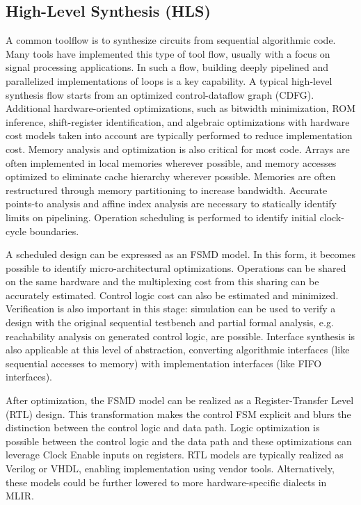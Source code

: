 \documentclass{tufte-handout}
\begin{document}
\subsection{High-Level Synthesis (HLS)}\label{sec:HLS}
A common toolflow is to synthesize circuits from sequential algorithmic code.  Many tools have implemented this type of tool flow, usually with a focus on signal processing applications.  In such a flow, building deeply pipelined and parallelized implementations of loops is a key capability.  A typical high-level synthesis flow starts from an optimized control-dataflow graph (CDFG).  Additional hardware-oriented optimizations, such as bitwidth minimization, ROM inference, shift-register identification, and algebraic optimizations with hardware cost models taken into account are typically performed to reduce implementation cost.  Memory analysis and optimization is also critical for most code.  Arrays are often implemented in local memories wherever possible, and memory accesses optimized to eliminate cache hierarchy wherever possible.  Memories are often restructured through memory partitioning to increase bandwidth.  Accurate points-to analysis and affine index analysis are necessary to statically identify limits on pipelining.   Operation scheduling is performed to identify initial clock-cycle boundaries.

A scheduled design can be expressed as an FSMD model.  In this form, it becomes possible to identify micro-architectural optimizations.  Operations can be shared on the same hardware and the multiplexing cost from this sharing can be accurately estimated.  Control logic cost can also be estimated and minimized.  Verification is also important in this stage: simulation can be used to verify a design with the original sequential testbench and partial formal analysis, e.g. reachability analysis on generated control logic, are possible.  Interface synthesis is also applicable at this level of abstraction, converting algorithmic interfaces (like sequential accesses to memory) with implementation interfaces (like FIFO interfaces).

After optimization, the FSMD model can be realized as a Register-Transfer Level (RTL) design.  This transformation makes the control FSM explicit and blurs the distinction between the control logic and data path.   Logic optimization is possible between the control logic and the data path and these optimizations can leverage Clock Enable inputs on registers.  RTL models are typically realized as Verilog or VHDL, enabling implementation using vendor tools.  Alternatively, these models could be further lowered to more hardware-specific dialects in MLIR.
\end{document}
